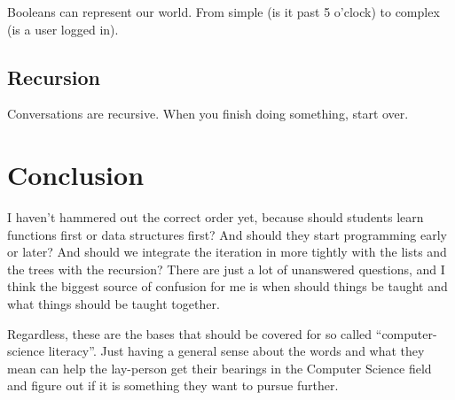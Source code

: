 \documentclass[12pt]{article}
\begin{document}
        Booleans can represent our world. From simple (is it past 5 o'clock) to complex (is a user logged in). 

      \subsection{Recursion}

        Conversations are recursive. When you finish doing something, start over. 

    \section{Conclusion}

      I haven't hammered out the correct order yet, because should students learn functions first or data structures first? And should they start programming early or later? And should we integrate the iteration in more tightly with the lists and the trees with the recursion? There are just a lot of unanswered questions, and I think the biggest source of confusion for me is when should things be taught and what things should be taught together. 

      Regardless, these are the bases that should be covered for so called ``computer-science literacy''. Just having a general sense about the words and what they mean can help the lay-person get their bearings in the Computer Science field and figure out if it is something they want to pursue further. 
\end{document}
